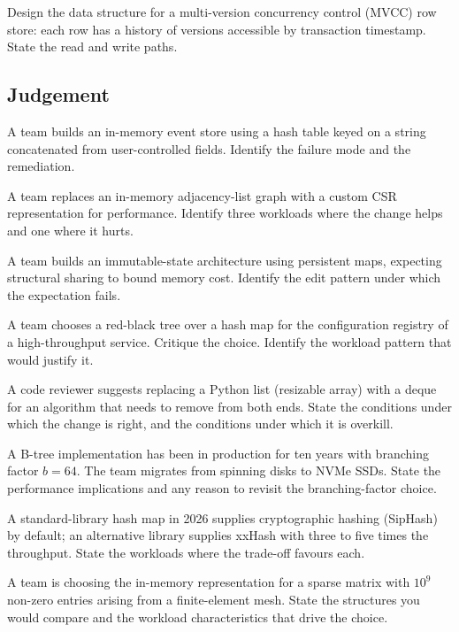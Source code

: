 \begin{exercise}
Design the data structure for a multi-version concurrency control (MVCC) row store: each row has a history of versions accessible by transaction timestamp. State the read and write paths.
\end{exercise}

\subsection*{Judgement}

\begin{exercise}
A team builds an in-memory event store using a hash table keyed on a string concatenated from user-controlled fields. Identify the failure mode and the remediation.
\end{exercise}

\begin{exercise}
A team replaces an in-memory adjacency-list graph with a custom CSR representation for performance. Identify three workloads where the change helps and one where it hurts.
\end{exercise}

\begin{exercise}
A team builds an immutable-state architecture using persistent maps, expecting structural sharing to bound memory cost. Identify the edit pattern under which the expectation fails.
\end{exercise}

\begin{exercise}
A team chooses a red-black tree over a hash map for the configuration registry of a high-throughput service. Critique the choice. Identify the workload pattern that would justify it.
\end{exercise}

\begin{exercise}
A code reviewer suggests replacing a Python list (resizable array) with a deque for an algorithm that needs to remove from both ends. State the conditions under which the change is right, and the conditions under which it is overkill.
\end{exercise}

\begin{exercise}
A B-tree implementation has been in production for ten years with branching factor $b = 64$. The team migrates from spinning disks to NVMe SSDs. State the performance implications and any reason to revisit the branching-factor choice.
\end{exercise}

\begin{exercise}
A standard-library hash map in 2026 supplies cryptographic hashing (SipHash) by default; an alternative library supplies xxHash with three to five times the throughput. State the workloads where the trade-off favours each.
\end{exercise}

\begin{exercise}
A team is choosing the in-memory representation for a sparse matrix with $10^9$ non-zero entries arising from a finite-element mesh. State the structures you would compare and the workload characteristics that drive the choice.
\end{exercise}
